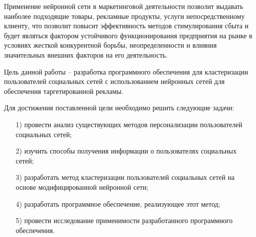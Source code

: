Применение нейронной сети в маркетинговой деятельности позволит выдавать наиболее подходящие товары, рекламные продукты, услуги непосредственному клиенту, что позволит повысит эффективность методов стимулирования сбыта и будет являться фактором устойчивого функционирования предприятия на рынке в условиях жесткой конкурентной борьбы, неопределенности и влияния значительных внешних факторов на его деятельность.

Цель данной работы -- разработка программного обеспечения для кластеризации пользователей социальных сетей с использованием нейронных сетей для обеспечения таргетированной рекламы.

Для достижения поставленной цели необходимо решить следующие задачи:
\begin{itemize}[leftmargin=1.6\parindent]
	\item[1)] провести анализ существующих методов персонализации пользователей социальных сетей;
	\item[2)] изучить способы получения информации о пользователях социальных сетей;
	\item[3)] разработать метод кластеризации пользователей социальных сетей  на основе модифицированной нейронной сети;
	\item[4)] разработать программное обеспечение, реализующее этот метод;
	\item[5)] провести исследование применимости разработанного программного обеспечения.
\end{itemize}

\pagebreak